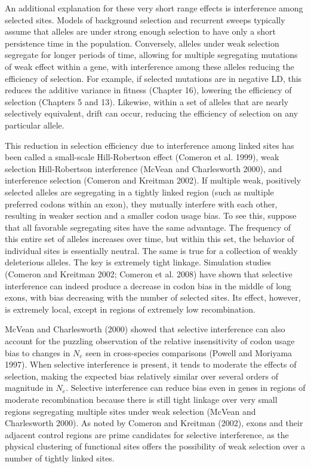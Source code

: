 \documentclass{article}
\begin{document}
An additional explanation for these very short range effects is interference among selected sites. Models of background selection and recurrent sweeps typically assume that alleles are under strong enough selection to have only a short persistence time in the population. Conversely, alleles under weak selection segregate for longer periods of time, allowing for multiple segregating mutations of weak effect within a gene, with interference among these alleles reducing the efficiency of selection. For example, if selected mutations are in negative LD, this reduces the additive variance in fitness (Chapter 16), lowering the efficiency of selection (Chapters 5 and 13). Likewise, within a set of alleles that are nearly selectively equivalent, drift can occur, reducing the efficiency of selection on any particular allele.

This reduction in selection efficiency due to interference among linked sites has been called a small-scale Hill-Robertson effect (Comeron et al. 1999), weak selection Hill-Robertson interference (McVean and Charlesworth 2000), and interference selection (Comeron and Kreitman 2002). If multiple weak, positively selected alleles are segregating in a tightly linked region (such as multiple preferred codons within an exon), they mutually interfere with each other, resulting in weaker section and a smaller codon usage bias. To see this, suppose that all favorable segregating sites have the same advantage. The frequency of this entire set of alleles increases over time, but within this set, the behavior of individual sites is essentially neutral. The same is true for a collection of weakly deleterious alleles. The key is extremely tight linkage. Simulation studies (Comeron and Kreitman 2002; Comeron et al. 2008) have shown that selective interference can indeed produce a decrease in codon bias in the middle of long exons, with bias decreasing with the number of selected sites. Its effect, however, is extremely local, except in regions of extremely low recombination.

McVean and Charlesworth (2000) showed that selective interference can also account for the puzzling observation of the relative insensitivity of codon usage bias to changes in  $ N_{e} $ seen in cross-species comparisons (Powell and Moriyama 1997). When selective interference is present, it tends to moderate the effects of selection, making the expected bias relatively similar over several orders of magnitude in  $ N_{e} $. Selective interference can reduce bias even in genes in regions of moderate recombination because there is still tight linkage over very small regions segregating multiple sites under weak selection (McVean and Charlesworth 2000). As noted by Comeron and Kreitman (2002), exons and their adjacent control regions are prime candidates for selective interference, as the physical clustering of functional sites offers the possibility of weak selection over a number of tightly linked sites.
\end{document}
